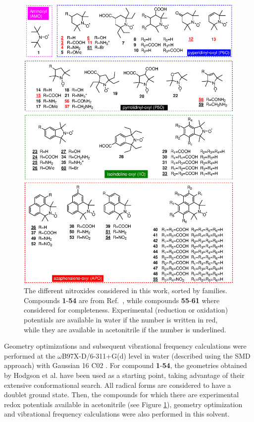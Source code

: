 \documentclass[review]{elsarticle}
\begin{document}
\begin{figure}[!p]
\centering
\includegraphics[width=\linewidth]{Figure4}
\caption{The different nitroxides considered in this work, sorted by families. Compounds \textbf{1}-\textbf{54} are from Ref.~, while compounds \textbf{55}-\textbf{61} where considered for completeness. Experimental (reduction or oxidation) potentials are available in water if the number is written in red, while they are available in acetonitrile if the number is underlined.}
\label{fig:nitroxides}
\end{figure}

Geometry optimizations and subsequent vibrational frequency calculations were performed at the $\omega$B97X-D/6-311+G(d) level in water (described using the SMD \cite{marenichUniversalSolvationModel2009} approach) with Gaussian 16 C02 \cite{g16}. For compound \textbf{1}-\textbf{54}, the geometries obtained by Hodgson et al. \cite{hodgsonOneElectronOxidationReduction2007} have been used as a starting point, taking advantage of their extensive conformational search. All radical forms are considered to have a doublet ground state. Then, the compounds for which there are experimental redox potentials available in acetonitrile (see Figure \ref{fig:nitroxides}), geometry optimization and vibrational frequency calculations were also performed in this solvent. 
\end{document}
